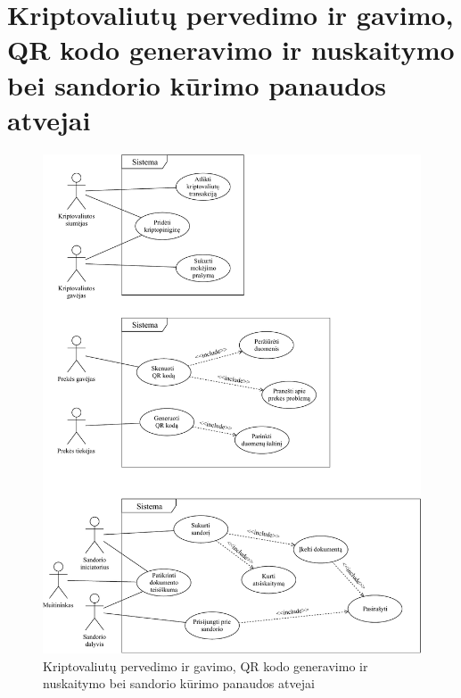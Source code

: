 \section{Kriptovaliutų pervedimo ir gavimo, QR kodo generavimo ir nuskaitymo bei sandorio kūrimo panaudos atvejai} \label{appendix:3}
\begin{figure}[H]
    \centering
    \includegraphics[scale=0.7]{images/ucd-3-4-5}
    \caption{Kriptovaliutų pervedimo ir gavimo, QR kodo generavimo ir nuskaitymo bei sandorio kūrimo panaudos atvejai}
\end{figure}



